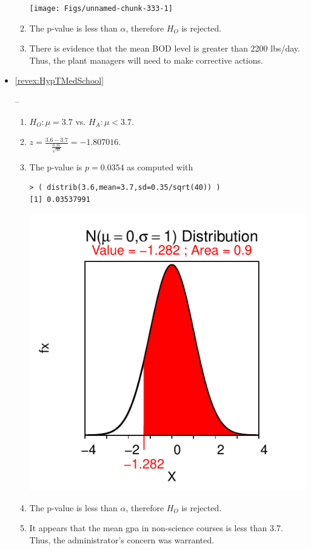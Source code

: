 \documentclass[10pt,openany]{book}\usepackage[]{graphicx}\usepackage[]{color}
\makeatletter
\newenvironment{kframe}{%
 \def\at@end@of@kframe{}%
 \ifinner\ifhmode%
  \def\at@end@of@kframe{\end{minipage}}%
  \begin{minipage}{\columnwidth}%
 \fi\fi%
 \def\FrameCommand##1{\hskip\@totalleftmargin \hskip-\fboxsep
 \colorbox{shadecolor}{##1}\hskip-\fboxsep
     \hskip-\linewidth \hskip-\@totalleftmargin \hskip\columnwidth}%
 \MakeFramed {\advance\hsize-\width
   \@totalleftmargin\z@ \linewidth\hsize
   \@setminipage}}%
 {\par\unskip\endMakeFramed%
 \at@end@of@kframe}
\newenvironment{knitrout}{}{} %
\makeatother
\begin{document}
\begin{itemize}
\begin{enumerate}
\begin{knitrout}
{\centering \texttt{[image: Figs/unnamed-chunk-333-1]} 

}



\end{knitrout}
      \item The p-value is less than $\alpha$, therefore $H_{O}$ is rejected.
      \item There is evidence that the mean BOD level is greater than 2200 lbs/day.  Thus, the plant managers will need to make corrective actions.
    \end{enumerate}

  \item \hypertarget{ans:HypTMedSchool}{\ref{revex:HypTMedSchool}} --
    \begin{enumerate}
      \item $H_{O}:\mu=3.7$ vs. $H_{A}:\mu<3.7$.
      \item $z=\frac{3.6-3.7}{\frac{0.35}{\sqrt{40}}}=-1.807016$.
      \item The p-value is $p=0.0354$ as computed with
\begin{knitrout}
\color{fgcolor}\begin{kframe}
\begin{verbatim}
> ( distrib(3.6,mean=3.7,sd=0.35/sqrt(40)) )
[1] 0.03537991
\end{verbatim}
\end{kframe}

{\centering \includegraphics[width=.4\linewidth]{Figs/unnamed-chunk-334-1} 

}



\end{knitrout}
      \item The p-value is less than $\alpha$, therefore $H_{O}$ is rejected.
      \item It appears that the mean gpa in non-science courses is less than 3.7.  Thus, the administrator's concern was warranted.
    \end{enumerate}


\end{itemize}
\end{document}
